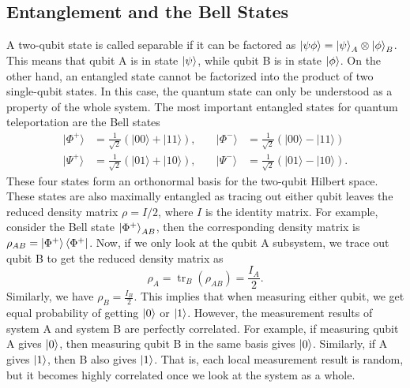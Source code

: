 \documentclass[aps,prd,preprint,floats,epsf,superscriptaddress,nofootinbib]{revtex4}
\newcommand{\tr}{\operatorname{tr}}
\begin{document}
\subsection{Entanglement and the Bell States}
A two-qubit state is called separable if it can be factored as $\ket{\psi \phi}=\ket{\psi}_A\otimes\ket{\phi}_B$. This means that qubit A is in state $\ket{\psi}$, while qubit B is in state $\ket{\phi}$. On the other hand, an entangled state cannot be factorized into the product of two single-qubit states. In this case, the quantum state can only be understood as a property of the whole system. 
The most important entangled states for quantum teleportation are the Bell states~\cite{NielsenChuang2000, Bennett}\begin{equation}
\begin{aligned}
|\Phi^+\rangle &= \frac{1}{\sqrt{2}}(|00\rangle + |11\rangle), 
&\quad |\Phi^-\rangle &= \frac{1}{\sqrt{2}}(|00\rangle - |11\rangle) \\[6pt]
|\Psi^+\rangle &= \frac{1}{\sqrt{2}}(|01\rangle + |10\rangle), 
&\quad |\Psi^-\rangle &= \frac{1}{\sqrt{2}}(|01\rangle - |10\rangle).
\end{aligned}
\end{equation}
These four states form an orthonormal basis for the two-qubit Hilbert space. These states are also maximally entangled as tracing out either qubit leaves the reduced density matrix $\rho=I/2$, where $I$ is the identity matrix. For example, consider the Bell state $\ket{\Phi^+}_{AB}$, then the corresponding density matrix is $\rho_{AB}=\ket{\Phi^+}\bra{\Phi^+}$. Now, if we only look at the qubit A subsystem, we trace out qubit B to get the reduced density matrix as \begin{equation}
  \rho_A=\tr_B(\rho_{AB})=\frac{I_A}{2}.
\end{equation} Similarly, we have $\rho_B=\frac{I_B}{2}$. This implies that when measuring either qubit, we get equal probability of getting $\ket{0}$ or $\ket{1}$. However, the measurement results of system A and system B are perfectly correlated. For example, if measuring qubit A gives $\ket{0}$, then measuring qubit B in the same basis gives $\ket{0}$. Similarly, if A gives $\ket{1}$, then B also gives $\ket{1}$. That is, each local measurement result is random, but it becomes highly correlated once we look at the system as a whole.
\end{document}
